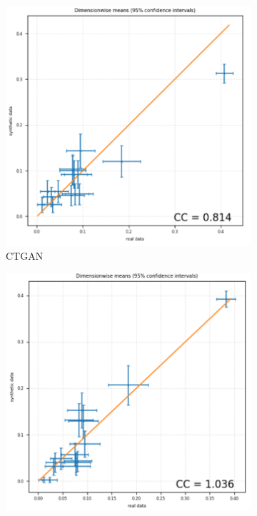 \begin{figure}[H]
    \centering
    \begin{subfigure}[b]{0.45\textwidth}
        \centering
        \includegraphics[width=\textwidth]{images/avg_dim_ctgan.png}
        \caption{CTGAN}
        \label{fig:avg_dim_ctgan}
    \end{subfigure}
    \hfill
    \begin{subfigure}[b]{0.45\textwidth}
        \centering
        \includegraphics[width=\textwidth]{images/avg_dim_begreat.png}

\end{subfigure}
\end{figure}

